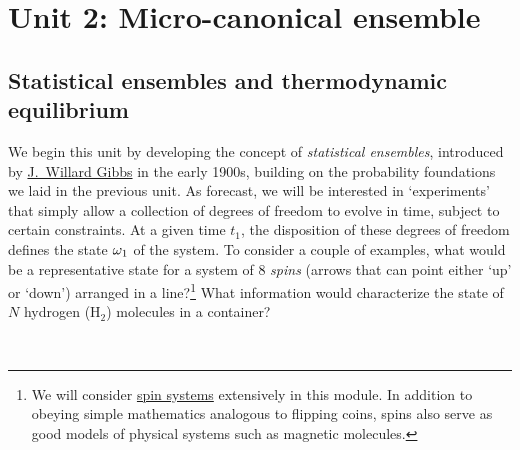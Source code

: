 \renewcommand{\thisunit}{MATH327 Unit 2}
\renewcommand{\moddate}{Last modified 3 Feb.~2022}
\setcounter{section}{2}
\setcounter{subsection}{0}
{}
\section*{Unit 2: Micro-canonical ensemble}
\subsection{Statistical ensembles and thermodynamic equilibrium}
We begin this unit by developing the concept of \textit{statistical ensembles}, introduced by \href{https://en.wikipedia.org/wiki/Josiah_Willard_Gibbs}{J.\ Willard Gibbs} in the early 1900s, building on the probability foundations we laid in the previous unit.
As forecast, we will be interested in `experiments' that simply allow a collection of degrees of freedom to evolve in time, subject to certain constraints.
At a given time $t_1$, the disposition of these degrees of freedom defines the state $\omega_1$ of the system.
To consider a couple of examples, what would be a representative state for a system of $8$ \textit{spins} (arrows that can point either `up' or `down') arranged in a line?\footnote{We will consider \href{https://en.wikipedia.org/wiki/Spin_model}{spin systems} extensively in this module.  In addition to obeying simple mathematics analogous to flipping coins, spins also serve as good models of physical systems such as magnetic molecules.}
What information would characterize the state of $N$ hydrogen (H$_2$) molecules in a container?
\begin{mdframed}
  \ \\[100 pt]
\end{mdframed}

